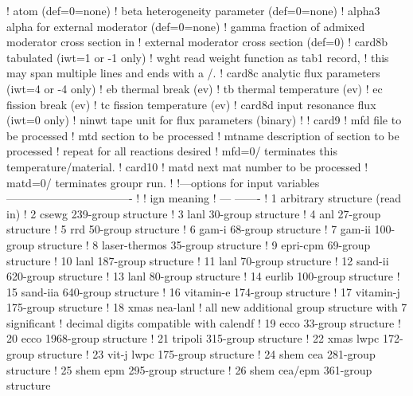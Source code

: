 \begin{ccode}
   !             atom (def=0=none)
   !    beta     heterogeneity parameter (def=0=none)
   !    alpha3   alpha for external moderator (def=0=none)
   !    gamma    fraction of admixed moderator cross section in
   !              external moderator cross section (def=0)
   ! card8b     tabulated (iwt=1 or -1 only)
   !    wght    read weight function as tab1 record,
   !            this may span multiple lines and ends with a /.
   ! card8c     analytic flux parameters (iwt=4 or -4 only)
   !    eb      thermal break (ev)
   !    tb      thermal temperature (ev)
   !    ec      fission break (ev)
   !    tc      fission temperature (ev)
   ! card8d     input resonance flux (iwt=0 only)
   !    ninwt   tape unit for flux parameters (binary)
   !
   ! card9
   !    mfd     file to be processed
   !    mtd     section to be processed
   !    mtname  description of section to be processed
   !          repeat for all reactions desired
   !          mfd=0/ terminates this temperature/material.
   ! card10
   !    matd    next mat number to be processed
   !            matd=0/ terminates groupr run.
   !
   !---options for input variables----------------------------------
   !
   !     ign          meaning
   !     ---          -------
   !      1           arbitrary structure (read in)
   !      2           csewg 239-group structure
   !      3           lanl 30-group structure
   !      4           anl 27-group structure
   !      5           rrd 50-group structure
   !      6           gam-i 68-group structure
   !      7           gam-ii 100-group structure
   !      8           laser-thermos 35-group structure
   !      9           epri-cpm 69-group structure
   !     10           lanl 187-group structure
   !     11           lanl 70-group structure
   !     12           sand-ii 620-group structure
   !     13           lanl 80-group structure
   !     14           eurlib 100-group structure
   !     15           sand-iia 640-group structure
   !     16           vitamin-e 174-group structure
   !     17           vitamin-j 175-group structure
   !     18           xmas nea-lanl
   !     all new additional group structure with 7 significant
   !     decimal digits compatible with calendf
   !     19           ecco  33-group structure
   !     20           ecco 1968-group structure
   !     21           tripoli 315-group structure
   !     22           xmas lwpc 172-group structure
   !     23           vit-j lwpc 175-group structure
   !     24           shem cea 281-group structure
   !     25           shem epm 295-group structure
   !     26           shem cea/epm 361-group structure

\end{ccode}
